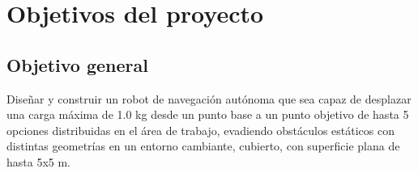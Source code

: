 
\chapter{Objetivos del proyecto}
\label{cap:proto-objetivos}


\vspace{-0.2cm}
\section{Objetivo general}
\label{sec:proto-objetivo-general}


Diseñar y construir un robot de navegación autónoma que sea capaz de desplazar una carga máxima de 1.0 kg desde un punto base a un punto objetivo de hasta 5 opciones distribuidas en el área de trabajo, evadiendo obstáculos estáticos con distintas geometrías en un entorno cambiante, cubierto, con superficie plana de hasta 5x5 m.
\vspace{-0.2cm}
